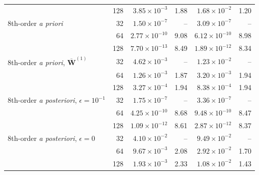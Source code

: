 \begin{table}
\begin{tabular}{lrrrrr}
 & 128 & $3.85 \times 10^{-3}$ & 1.88 & $1.68 \times 10^{-2}$ & 1.20 \\
8th-order \textit{a priori} & 32 & $1.50 \times 10^{-7}$ & -- & $3.09 \times 10^{-7}$ & -- \\
 & 64 & $2.77 \times 10^{-10}$ & 9.08 & $6.12 \times 10^{-10}$ & 8.98 \\
 & 128 & $7.70 \times 10^{-13}$ & 8.49 & $1.89 \times 10^{-12}$ & 8.34 \\
8th-order \textit{a priori}, $\overline{\boldsymbol{W}}^{(1)}$ & 32 & $4.62 \times 10^{-3}$ & -- & $1.23 \times 10^{-2}$ & -- \\
 & 64 & $1.26 \times 10^{-3}$ & 1.87 & $3.20 \times 10^{-3}$ & 1.94 \\
 & 128 & $3.27 \times 10^{-4}$ & 1.94 & $8.38 \times 10^{-4}$ & 1.94 \\
8th-order \textit{a posteriori}, $\epsilon=10^{-1}$ & 32 & $1.75 \times 10^{-7}$ & -- & $3.36 \times 10^{-7}$ & -- \\
 & 64 & $4.25 \times 10^{-10}$ & 8.68 & $9.48 \times 10^{-10}$ & 8.47 \\
 & 128 & $1.09 \times 10^{-12}$ & 8.61 & $2.87 \times 10^{-12}$ & 8.37 \\
8th-order \textit{a posteriori}, $\epsilon=0$ & 32 & $4.10 \times 10^{-2}$ & -- & $9.49 \times 10^{-2}$ & -- \\
 & 64 & $9.67 \times 10^{-3}$ & 2.08 & $2.92 \times 10^{-2}$ & 1.70 \\
 & 128 & $1.93 \times 10^{-3}$ & 2.33 & $1.08 \times 10^{-2}$ & 1.43 \\
\bottomrule
\end{tabular}
\end{table}
